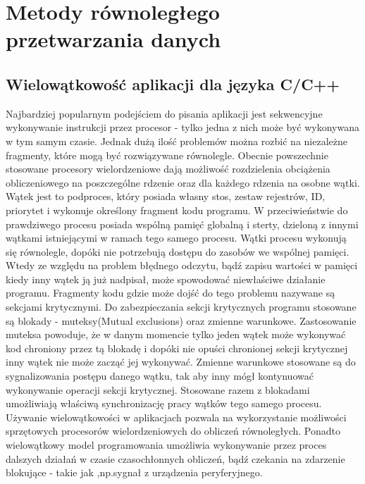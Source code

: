 \documentclass[document.tex]{subfiles}
\begin{document}
\chapter{Metody równoległego przetwarzania danych}

\section{Wielowątkowość aplikacji dla języka C/C++}
\indent Najbardziej popularnym podejściem do pisania aplikacji jest sekwencyjne wykonywanie
instrukcji przez procesor - tylko jedna z nich może być wykonywana w tym samym czasie.
Jednak dużą ilość problemów można rozbić na niezależne fragmenty,
które mogą być rozwiązywane równolegle. Obecnie powszechnie stosowane procesory wielordzeniowe dają możliwość rozdzielenia obciążenia obliczeniowego na poszczególne rdzenie oraz dla każdego rdzenia na osobne wątki.\cite{Computer_Architecture_Patterson_Hennesy}\cite{Parallel_computing_article} \\
 \indent Wątek jest to podproces, który posiada własny stos, zestaw rejestrów, ID, priorytet i wykonuje określony fragment kodu programu. 
 W przeciwieństwie do prawdziwego procesu posiada wspólną pamięć globalną i sterty, dzieloną z innymi wątkami istniejącymi w ramach tego samego procesu. 
 Wątki procesu wykonują się równolegle, dopóki nie potrzebują dostępu do zasobów we wspólnej pamięci.\cite{POSIX_article}\cite{POSIX_tutorial} 
 Wtedy ze względu na problem błędnego odczytu, bądź zapisu wartości w pamięci kiedy inny wątek ją już nadpisał, może spowodować niewłaściwe działanie programu. 
 Fragmenty kodu gdzie może dojść do tego problemu nazywane są sekcjami krytycznymi. Do zabezpieczania sekcji krytycznych programu stosowane są blokady - muteksy(Mutual exclusions) oraz zmienne warunkowe.
 Zastosowanie muteksa powoduje, że w danym momencie tylko jeden wątek może wykonywać kod chroniony przez tą blokadę i dopóki nie opuści chronionej sekcji krytycznej inny wątek nie może zacząć jej wykonywać. 
 Zmienne warunkowe stosowane są do sygnalizowania postępu danego wątku, tak aby inny mógł kontynuować wykonywanie operacji sekcji krytycznej. 
 Stosowane razem z blokadami umożliwiają właściwą synchronizację pracy wątków tego samego procesu.
\cite{POSIX_Butenhof}\cite{C++_Stroustrup} \\
\indent Używanie wielowątkowości w aplikacjach pozwala na wykorzystanie możliwości sprzętowych procesorów wielordzeniowych do obliczeń równoległych.
Ponadto wielowątkowy model programowania umożliwia wykonywanie przez proces dalszych działań w czasie czasochłonnych obliczeń, bądź czekania na zdarzenie blokujące - takie jak ,np.sygnał z urządzenia peryferyjnego.
\end{document}
